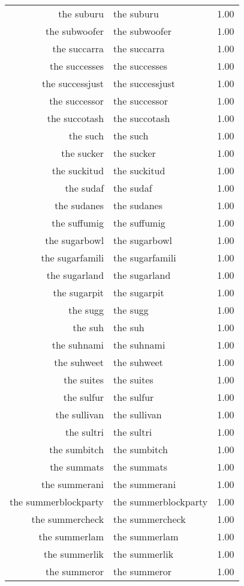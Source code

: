 \begin{table}[ht]
\begin{tabular}{rlr}
  the suburu & the suburu & 1.00 \\ 
  the subwoofer & the subwoofer & 1.00 \\ 
  the succarra & the succarra & 1.00 \\ 
  the successes & the successes & 1.00 \\ 
  the successjust & the successjust & 1.00 \\ 
  the successor & the successor & 1.00 \\ 
  the succotash & the succotash & 1.00 \\ 
  the such & the such & 1.00 \\ 
  the sucker & the sucker & 1.00 \\ 
  the suckitud & the suckitud & 1.00 \\ 
  the sudaf & the sudaf & 1.00 \\ 
  the sudanes & the sudanes & 1.00 \\ 
  the suffumig & the suffumig & 1.00 \\ 
  the sugarbowl & the sugarbowl & 1.00 \\ 
  the sugarfamili & the sugarfamili & 1.00 \\ 
  the sugarland & the sugarland & 1.00 \\ 
  the sugarpit & the sugarpit & 1.00 \\ 
  the sugg & the sugg & 1.00 \\ 
  the suh & the suh & 1.00 \\ 
  the suhnami & the suhnami & 1.00 \\ 
  the suhweet & the suhweet & 1.00 \\ 
  the suites & the suites & 1.00 \\ 
  the sulfur & the sulfur & 1.00 \\ 
  the sullivan & the sullivan & 1.00 \\ 
  the sultri & the sultri & 1.00 \\ 
  the sumbitch & the sumbitch & 1.00 \\ 
  the summats & the summats & 1.00 \\ 
  the summerani & the summerani & 1.00 \\ 
  the summerblockparty & the summerblockparty & 1.00 \\ 
  the summercheck & the summercheck & 1.00 \\ 
  the summerlam & the summerlam & 1.00 \\ 
  the summerlik & the summerlik & 1.00 \\ 
  the summeror & the summeror & 1.00 \\ 

\end{tabular}
\end{table}
